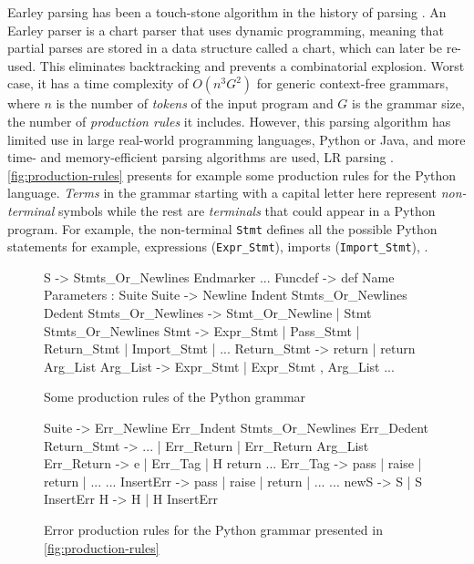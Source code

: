  Earley parsing has been a touch-stone algorithm in the
history of parsing \citep{?}. An Earley parser is a chart parser that uses
dynamic programming, meaning that partial parses are stored in a data structure
called a chart, which can later be re-used. This eliminates backtracking and
prevents a combinatorial explosion. Worst case, it has a time complexity of
$O(n^3 G^2)$ for generic context-free grammars, where $n$ is the number of
\emph{tokens} of the input program and $G$ is the grammar size, \ie the number
of \emph{production rules} it includes. However, this parsing algorithm has
limited use in large real-world programming languages, \eg Python or Java, and
more time- and memory-efficient parsing algorithms are used, \eg LR parsing \etc
\citep{?}. \autoref{fig:production-rules} presents for example some production
rules for the Python language. \emph{Terms} in the grammar starting with a
capital letter here represent \emph{non-terminal} symbols while the rest are
\emph{terminals} that could appear in a Python program. For example, the
non-terminal \texttt{Stmt} defines all the possible Python statements for
example, \ie expressions (\texttt{Expr\_Stmt}), imports (\texttt{Import\_Stmt}),
\etc.

\begin{figure}[ht]
\begin{ecode}
S -> Stmts_Or_Newlines Endmarker
...
Funcdef -> def Name Parameters : Suite
Suite -> Newline Indent Stmts_Or_Newlines Dedent
Stmts_Or_Newlines -> Stmt_Or_Newline | Stmt Stmts_Or_Newlines
Stmt -> Expr_Stmt | Pass_Stmt | Return_Stmt | Import_Stmt | ...
Return_Stmt -> return | return Arg_List
Arg_List -> Expr_Stmt | Expr_Stmt , Arg_List
...
\end{ecode}
\caption{Some production rules of the Python grammar}
\label{fig:production-rules}
\end{figure}

\begin{figure}[ht]
\begin{ecode}
Suite -> Err_Newline Err_Indent Stmts_Or_Newlines Err_Dedent
Return_Stmt -> ... | Err_Return | Err_Return Arg_List
Err_Return -> e | Err_Tag | H return
...
Err_Tag -> pass | raise | return | ...
...
InsertErr -> pass | raise | return | ...
...
newS -> S | S InsertErr
H -> H | H InsertErr
\end{ecode}
\caption{Error production rules for the Python grammar presented in
\autoref{fig:production-rules}}
\label{fig:error-rules}
\end{figure}

